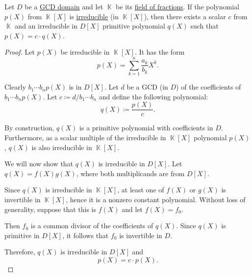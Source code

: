 \begin{lemma}\label{thm:irreducible_primitive_polynomial_in_field_of_fractions}
  Let \( D \) be a \hyperref[def:gcd_domain]{GCD domain} and let \( \BbbK \) be its \hyperref[def:field_of_fractions]{field of fractions}. If the polynomial \( p(X) \) from \( \BbbK[X] \) is \hyperref[def:domain_divisibility/irreducible]{irreducible} (in \( \BbbK[X] \)), then there exists a scalar \( c \) from \( \BbbK \) and an irreducible in \( D[X] \) primitive polynomial \( q(X) \) such that \( p(X) = c \cdot q(X) \).
\end{lemma}
\begin{proof}
  Let \( p(X) \) be irreducible in \( \BbbK[X] \). It has the form
  \begin{equation*}
    p(X) = \sum_{k=1}^n \frac {a_k} {b_k} X^k.
  \end{equation*}

  Clearly \( b_1 \cdots b_n p(X) \) is in \( D[X] \). Let \( d \) be a GCD (in \( D \)) of the coefficients of \( b_1 \cdots b_n p(X) \). Let \( c \coloneqq d / b_1 \cdots b_n \) and define the following polynomial:
  \begin{equation*}
    q(X) \coloneqq \frac {p(X)} c.
  \end{equation*}

  By construction, \( q(X) \) is a primitive polynomial with coefficients in \( D \). Furthermore, as a scalar multiple of the irreducible in \( \BbbK[X] \) polynomial \( p(X) \), \( q(X) \) is also irreducible in \( \BbbK[X] \).

  We will now show that \( q(X) \) is irreducible in \( D[X] \). Let \( q(X) = f(X) g(X) \), where both multiplicands are from \( D[X] \).

  Since \( q(X) \) is irreducible in \( \BbbK[X] \), at least one of \( f(X) \) or \( g(X) \) is invertible in \( \BbbK[X] \), hence it is a nonzero constant polynomial. Without loss of generality, suppose that this is \( f(X) \) and let \( f(X) = f_0 \).

  Then \( f_0 \) is a common divisor of the coefficients of \( q(X) \). Since \( q(X) \) is primitive in \( D[X] \), it follows that \( f_0 \) is invertible in \( D \).

  Therefore, \( q(X) \) is irreducible in \( D[X] \) and
  \begin{equation*}
    p(X) = c \cdot p(X).
  \end{equation*}
\end{proof}

